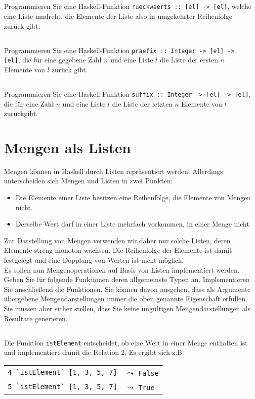 \documentclass[
  10pt,                   %
  DIV12,
  german,                 %
  oneside,                %
  parskip=half,           %
  headings=normal,        %
  captions=tableheading,  %
]{scrartcl}
\begin{document}
\subsection{}
Programmieren Sie eine Haskell-Funktion \lstinline|rueckwaerts :: [el] -> [el]|, welche eine Liste umdreht, die Elemente der Liste also in umgekehrter Reihenfolge zurück gibt.
\subsection{}
Programmieren Sie eine Haskell-Funktion \lstinline|praefix :: Integer -> [el] -> [el]|, die für eine gegebene Zahl $n$ und eine Liste $l$ die Liste der ersten $n$ Elemente von $l$ zurück gibt.
\subsection{}
Programmieren Sie eine Haskell-Funktion \lstinline|suffix :: Integer -> [el] -> [el]|, die für eine Zahl $n$ und eine Liste $l$ die Liste der letzten $n$ Elemente von $l$ zurückgibt.

\section{Mengen als Listen}
Mengen können in Haskell durch Listen repräsentiert werden. Allerdings unterscheiden
sich Mengen und Listen in zwei Punkten:
\begin{itemize}
  \item Die Elemente einer Liste besitzen eine Reihenfolge, die Elemente von Mengen
nicht.
\item Derselbe Wert darf in einer Liste mehrfach vorkommen, in einer Menge nicht.
\end{itemize}
Zur Darstellung von Mengen verwenden wir daher nur solche Listen, deren Elemente
streng monoton wachsen. Die Reihenfolge der Elemente ist damit festgelegt und eine
Dopplung von Werten ist nicht möglich.\\

Es sollen nun Mengenoperationen auf Basis von Listen implementiert werden. Geben Sie
für folgende Funktionen deren allgemeinste Typen an. Implementieren Sie anschließend
die Funktionen. Sie können davon ausgehen, dass als Argumente übergebene Mengendarstellungen
immer die oben genannte Eigenschaft erfüllen. Sie müssen aber sicher
stellen, dass Sie keine ungültigen Mengendarstellungen als Resultate generieren.
\subsection{}
Die Funktion \lstinline|istElement| entscheidet, ob eine Wert in einer
Menge enthalten ist und implementiert damit die Relation 2. Es ergibt sich z.B.
\begin{center}
\begin{tabular}{ll}
\lstinline|4 `istElement` [1, 3, 5, 7]| & $\leadsto$ \lstinline|False|\\
\lstinline|5 `istElement` [1, 3, 5, 7]| & $\leadsto$ \lstinline|True|
\end{tabular}
\end{center}
\end{document}
